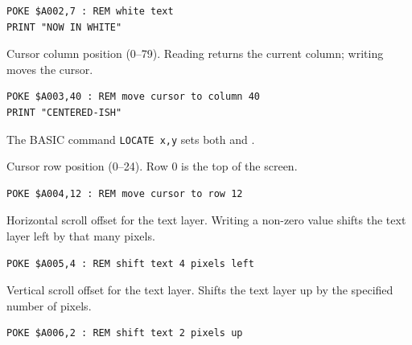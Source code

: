 \begin{lstlisting}
POKE $A002,7 : REM white text
PRINT "NOW IN WHITE"
\end{lstlisting}



Cursor column position (0--79).  Reading returns the current column; writing
moves the cursor.

\begin{lstlisting}
POKE $A003,40 : REM move cursor to column 40
PRINT "CENTERED-ISH"
\end{lstlisting}

\begin{notebox}
The BASIC command \texttt{LOCATE x,y} sets both  and .
\end{notebox}



Cursor row position (0--24).  Row 0 is the top of the screen.

\begin{lstlisting}
POKE $A004,12 : REM move cursor to row 12
\end{lstlisting}



Horizontal scroll offset for the text layer.  Writing a non-zero value shifts
the text layer left by that many pixels.

\begin{lstlisting}
POKE $A005,4 : REM shift text 4 pixels left
\end{lstlisting}



Vertical scroll offset for the text layer.  Shifts the text layer up by the
specified number of pixels.

\begin{lstlisting}
POKE $A006,2 : REM shift text 2 pixels up
\end{lstlisting}


